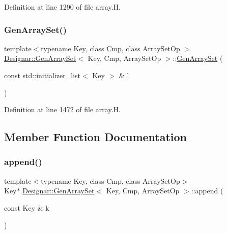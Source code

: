 Definition at line 1290 of file array.\+H.

\mbox{\label{class_designar_1_1_gen_array_set_a53cc511f4539c16b1542f56979433c2a}} 
\subsubsection{\texorpdfstring{Gen\+Array\+Set()}{GenArraySet()}\hspace{0.1cm}{\footnotesize\ttfamily [6/6]}}
{\footnotesize\ttfamily template$<$typename Key, class Cmp, class Array\+Set\+Op $>$ \\
\hyperlink{class_designar_1_1_gen_array_set}{Designar\+::\+Gen\+Array\+Set}$<$ Key, Cmp, Array\+Set\+Op $>$\+::\hyperlink{class_designar_1_1_gen_array_set}{Gen\+Array\+Set} (\begin{DoxyParamCaption}\item[{const std\+::initializer\+\_\+list$<$ Key $>$ \&}]{l }\end{DoxyParamCaption})}



Definition at line 1472 of file array.\+H.



\subsection{Member Function Documentation}
\mbox{\label{class_designar_1_1_gen_array_set_ac1367b0dd7bc3f90fc73101991dc398a}} 
\subsubsection{\texorpdfstring{append()}{append()}\hspace{0.1cm}{\footnotesize\ttfamily [1/2]}}
{\footnotesize\ttfamily template$<$typename Key, class Cmp, class Array\+Set\+Op$>$ \\
Key$\ast$ \hyperlink{class_designar_1_1_gen_array_set}{Designar\+::\+Gen\+Array\+Set}$<$ Key, Cmp, Array\+Set\+Op $>$\+::append (\begin{DoxyParamCaption}\item[{const Key \&}]{k }\end{DoxyParamCaption})\hspace{0.3cm}{\ttfamily [inline]}}



